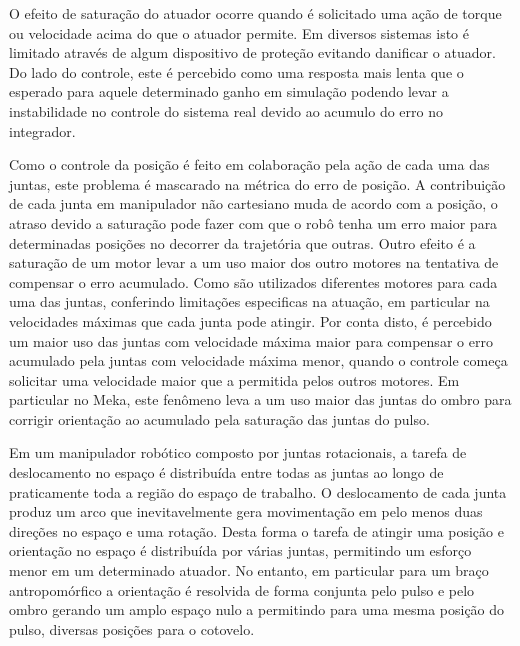 O efeito de saturação do atuador ocorre quando é solicitado uma ação de torque ou velocidade acima do que o atuador permite. Em diversos sistemas isto é limitado através de algum dispositivo de proteção evitando danificar o atuador. Do lado do controle, este é percebido como uma resposta mais lenta que o esperado para aquele determinado ganho em simulação podendo levar a instabilidade no controle do sistema real devido ao acumulo do erro no integrador.

Como o controle da posição é feito em colaboração pela ação de cada uma das juntas, este problema é mascarado na métrica do erro de posição. A contribuição de cada junta em manipulador não cartesiano muda de acordo com a posição, o atraso devido a saturação pode fazer com que o robô tenha um erro maior para determinadas posições no decorrer da trajetória que outras. Outro efeito é a saturação de um motor levar a um uso maior dos outro motores na tentativa de compensar o erro acumulado. Como são utilizados diferentes motores para cada uma das juntas, conferindo limitações especificas na atuação, em particular na velocidades máximas que cada junta pode atingir. Por conta disto, é percebido um maior uso das juntas com velocidade máxima maior para compensar o erro acumulado pela juntas com velocidade máxima menor, quando o controle começa solicitar uma velocidade maior que a permitida pelos outros motores. Em particular no Meka, este fenômeno leva a um uso maior das juntas do ombro para corrigir orientação ao acumulado pela saturação das juntas do pulso.

Em um manipulador robótico composto por juntas rotacionais, a tarefa de deslocamento no espaço é distribuída entre todas as juntas ao longo de praticamente toda a região do espaço de trabalho. O deslocamento de cada junta produz um arco que inevitavelmente gera movimentação em pelo menos duas direções no espaço e uma rotação. Desta forma o tarefa de atingir uma posição e orientação no espaço é distribuída por várias juntas, permitindo um esforço menor em um determinado atuador. No entanto, em particular para um braço antropomórfico a orientação é resolvida de forma conjunta pelo pulso e pelo ombro gerando um amplo espaço nulo a permitindo para uma mesma posição do pulso, diversas posições para o cotovelo.

